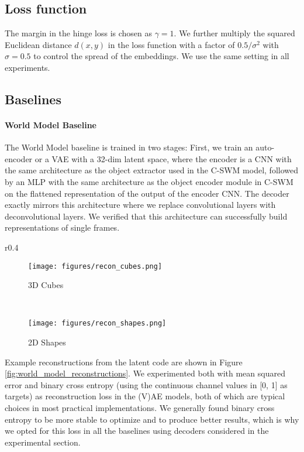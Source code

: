 \documentclass{article} %
\begin{document}
\subsection{Loss function}
The margin in the hinge loss is chosen as $\gamma=1$. We further multiply the squared Euclidean distance $d(x,y)$ in the loss function with a factor of $0.5/\sigma^2$ with $\sigma=0.5$ to control the spread of the embeddings. We use the same setting in all experiments.

\subsection{Baselines}
\paragraph{World Model Baseline}

The World Model baseline is trained in two stages: First, we train an auto-encoder or a VAE with a 32-dim latent space, where the encoder is a CNN with the same architecture as the object extractor used in the C-SWM model, followed by an MLP with the same architecture as the object encoder module in C-SWM on the flattened representation of the output of the encoder CNN. The decoder exactly mirrors this architecture where we replace convolutional layers with deconvolutional layers. We verified that this architecture can successfully build representations of single frames.


\begin{wrapfigure}{r}{0.4\textwidth}
\centering
  \begin{subfigure}[b]{0.16\textwidth}
  \centering
    \texttt{[image: figures/recon\_cubes.png]}
    \caption{3D Cubes}
  \end{subfigure}
  ~
  \begin{subfigure}[b]{0.16\textwidth}
  \centering
    \texttt{[image: figures/recon\_shapes.png]}
    \caption{2D Shapes}
  \end{subfigure}
  \caption{Reconstructions from the latent code of a trained VAE-based World Model baseline.\label{fig:world_model_reconstructions}}
  \vspace{-1em}
\end{wrapfigure}
Example reconstructions from the latent code are shown in Figure \ref{fig:world_model_reconstructions}. We experimented both with mean squared error and binary cross entropy (using the continuous channel values in [0, 1] as targets) as reconstruction loss in the (V)AE models, both of which are typical choices in most practical implementations. We generally found binary cross entropy to be more stable to optimize and to produce better results, which is why we opted for this loss in all the baselines using decoders considered in the experimental section.
\end{document}
